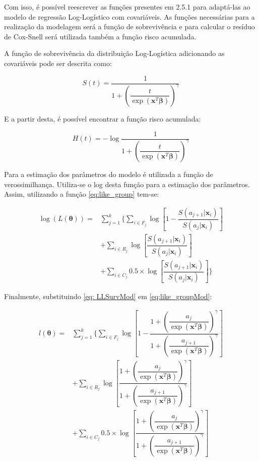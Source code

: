 \documentclass[a4paper,12pt]{article}
\begin{document}
Com isso, é possível reescrever as funções presentes em 2.5.1 para adaptá-las ao modelo de regressão Log-Logístico com covariáveis. As funções necessárias para a realização da modelagem será a função de sobrevivência e para calcular o resíduo de Cox-Snell será utilizada também a função risco acumulada.

A função de sobrevivência da distribuição Log-Logística adicionando as covariáveis pode ser descrita como:

\begin{equation} \label{eq: LLSurvMod}
  S(t) = \dfrac{1}{1 + \left(\dfrac{t}{\exp(\boldsymbol{x}^T\boldsymbol{\beta})}\right)^{\gamma}}
\end{equation}

E a partir desta, é possível encontrar a função risco acumulada:

\begin{equation} \label{eq: HazLLMod}
H(t) = - \log{\dfrac{1}{1 + \left(\dfrac{t}{\exp(\boldsymbol{x}^T\boldsymbol{\beta})}\right)^{\gamma}}}
\end{equation}

Para a estimação dos parâmetros do modelo é utilizada a função de verossimilhança. Utiliza-se o log desta função para a estimação dos parâmetros. Assim, utilizando a função \ref{eq:like_group} tem-se:

\begin{equation} \label{eq:like_groupMod}
  \begin{split}
  \log(L(\boldsymbol{\theta}))  =  &\sum\limits_{j=1}^k\Bigg\{ \sum\limits_{i\in F_j} \log\left[1 - \dfrac{S(a_{j+1}|\boldsymbol{x}_i)}{S(a_{j}|\boldsymbol{x}_i)}\right] \\
    & + \sum\limits_{i\in R_j} \log\left[\dfrac{S(a_{j+1}|\boldsymbol{x}_i)}{S(a_{j}|\boldsymbol{x}_i)}\right] \\
    & + \sum\limits_{i\in C_j} 0.5\times\log\left[\dfrac{S(a_{j+1}|\boldsymbol{x}_i)}{S(a_{j}|\boldsymbol{x}_i)}\right]\Bigg\}
\end{split}
\end{equation}

Finalmente, substituindo \ref{eq: LLSurvMod} em \ref{eq:like_groupMod}:

\begin{equation} \label{eq:like_groupMod}
  \begin{split}
    l(\boldsymbol{\theta}) = & \sum\limits_{j=1}^k\Bigg\{ \sum\limits_{i\in F_j} \log\left[1 - \dfrac{1 + \left(\dfrac{a_j}{\exp(\boldsymbol{x}^T\boldsymbol{\beta})}\right)^{\gamma}}{1 + \left(\dfrac{a_{j+1}}{\exp(\boldsymbol{x}^T\boldsymbol{\beta})}\right)^{\gamma}}\right] \\
    & +\sum\limits_{i\in R_j} \log\left[\dfrac{1 + \left(\dfrac{a_j}{\exp(\boldsymbol{x}^T\boldsymbol{\beta})}\right)^{\gamma}}{1 + \left(\dfrac{a_{j+1}}{\exp(\boldsymbol{x}^T\boldsymbol{\beta})}\right)^{\gamma}}\right] \\
    & + \sum\limits_{i\in C_j} 0.5\times \log\left[\dfrac{1 + \left(\dfrac{a_j}{\exp(\boldsymbol{x}^T\boldsymbol{\beta})}\right)^{\gamma}}{1 + \left(\dfrac{a_{j+1}}{\exp(\boldsymbol{x}^T\boldsymbol{\beta})}\right)^{\gamma}}\right]
  \end{split}
\end{equation}
\end{document}
